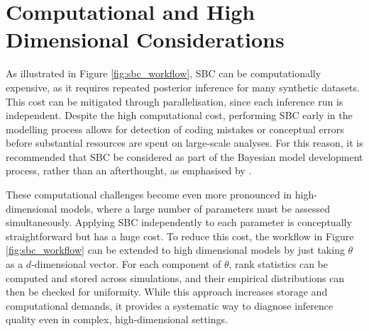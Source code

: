 \section{Computational and High Dimensional Considerations}
\label{sec:computational_considerations}

As illustrated in Figure \ref{fig:sbc_workflow}, SBC can be computationally expensive, as it requires repeated posterior inference for many synthetic datasets.
This cost can be mitigated through parallelisation, since each inference run is independent.
Despite the high computational cost, performing SBC early in the modelling process allows for detection of coding mistakes or conceptual errors before substantial resources are spent on large-scale analyses.
For this reason, it is recommended that SBC be considered as part of the Bayesian model development process, rather than an afterthought, as emphasised by \textcite{gelman_2020}.

These computational challenges become even more pronounced in high-dimensional models, where a large number of parameters must be assessed simultaneously.
Applying SBC independently to each parameter is conceptually straightforward but has a huge cost.
To reduce this cost, the workflow in Figure \ref{fig:sbc_workflow} can be extended to high dimensional models by just taking $\theta$ as a $d$-dimensional vector.
For each component of $\theta$, rank statistics can be computed and stored across simulations, and their empirical distributions can then be checked for uniformity.
While this approach increases storage and computational demands, it provides a systematic way to diagnose inference quality even in complex, high-dimensional settings.
